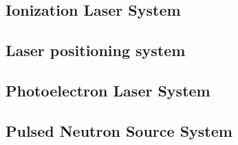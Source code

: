 
\subsection{Ionization Laser System}
\label{sec:dp-calib-sys-las-ion}


\subsection{Laser positioning system}
\label{sec:dp-calib-sys-las-pos}


\subsection{Photoelectron Laser System}
\label{sec:dp-calib-sys-las-pe}


\subsection{Pulsed Neutron Source System}
\label{sec:dp-calib-sys-pns}
 




%
%

